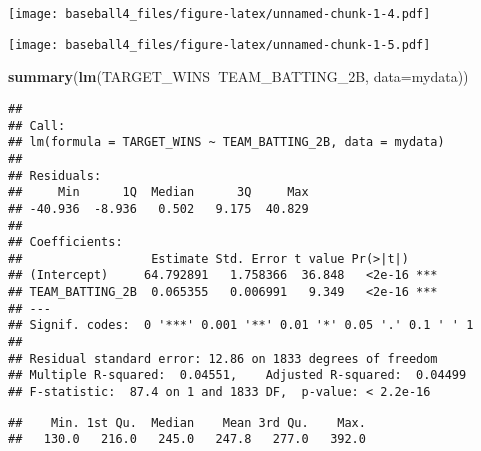 \documentclass[
]{article}
\newenvironment{Shaded}{\begin{snugshade}}{\end{snugshade}}
\newcommand{\DataTypeTok}[1]{\textcolor[rgb]{0.13,0.29,0.53}{#1}}
\newcommand{\KeywordTok}[1]{\textcolor[rgb]{0.13,0.29,0.53}{\textbf{#1}}}
\newcommand{\NormalTok}[1]{#1}
\newcommand{\OperatorTok}[1]{\textcolor[rgb]{0.81,0.36,0.00}{\textbf{#1}}}
\begin{document}
\texttt{[image: baseball4\_files/figure-latex/unnamed-chunk-1-4.pdf]}

\begin{Shaded}
\end{Shaded}

\texttt{[image: baseball4\_files/figure-latex/unnamed-chunk-1-5.pdf]}

\begin{Shaded}
\begin{Highlighting}[]
\KeywordTok{summary}\NormalTok{(}\KeywordTok{lm}\NormalTok{(TARGET_WINS}\OperatorTok{~}\NormalTok{TEAM_BATTING_2B, }\DataTypeTok{data=}\NormalTok{mydata))}
\end{Highlighting}
\end{Shaded}

\begin{verbatim}
## 
## Call:
## lm(formula = TARGET_WINS ~ TEAM_BATTING_2B, data = mydata)
## 
## Residuals:
##     Min      1Q  Median      3Q     Max 
## -40.936  -8.936   0.502   9.175  40.829 
## 
## Coefficients:
##                  Estimate Std. Error t value Pr(>|t|)    
## (Intercept)     64.792891   1.758366  36.848   <2e-16 ***
## TEAM_BATTING_2B  0.065355   0.006991   9.349   <2e-16 ***
## ---
## Signif. codes:  0 '***' 0.001 '**' 0.01 '*' 0.05 '.' 0.1 ' ' 1
## 
## Residual standard error: 12.86 on 1833 degrees of freedom
## Multiple R-squared:  0.04551,    Adjusted R-squared:  0.04499 
## F-statistic:  87.4 on 1 and 1833 DF,  p-value: < 2.2e-16
\end{verbatim}

\begin{Shaded}
\end{Shaded}

\begin{verbatim}
##    Min. 1st Qu.  Median    Mean 3rd Qu.    Max. 
##   130.0   216.0   245.0   247.8   277.0   392.0
\end{verbatim}

\begin{Shaded}
\end{Shaded}
\end{document}
